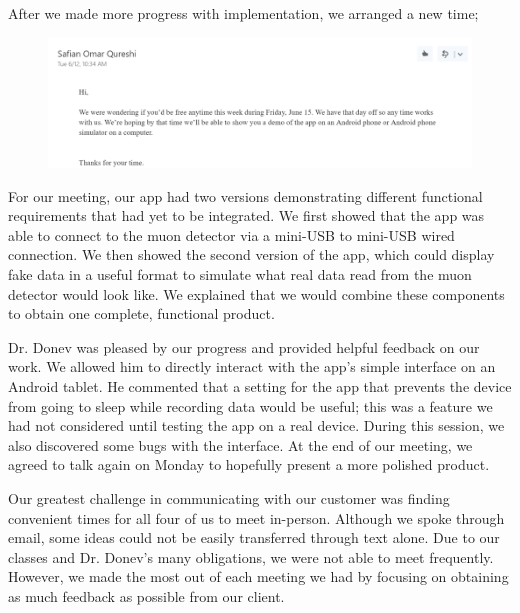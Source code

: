 \documentclass[11pt,a4paper]{article}
\begin{document}
After we made more progress with implementation, we arranged a new time;

\begin{figure}[h] \centering
	\includegraphics[width=1.2\textwidth]{email2.png}
\end{figure}

For our meeting, our app had two versions demonstrating different functional requirements that had yet to be integrated. We first showed that the app was able to connect to the muon detector via a mini-USB to mini-USB wired connection. We then showed the second version of the app, which could display fake data in a useful format to simulate what real data read from the muon detector would look like. We explained that we would combine these components to obtain one complete, functional product.

Dr. Donev was pleased by our progress and provided helpful feedback on our work. We allowed him to directly interact with the app’s simple interface on an Android tablet. He commented that a setting for the app that prevents the device from going to sleep while recording data would be useful; this was a feature we had not considered until testing the app on a real device. During this session, we also discovered some bugs with the interface. At the end of our meeting, we agreed to talk again on Monday to hopefully present a more polished product. 

Our greatest challenge in communicating with our customer was finding convenient times for all four of us to meet in-person. Although we spoke through email, some ideas could not be easily transferred through text alone. Due to our classes and Dr. Donev’s many obligations, we were not able to meet frequently. However, we made the most out of each meeting we had by focusing on obtaining as much feedback as possible from our client.
\end{document}

